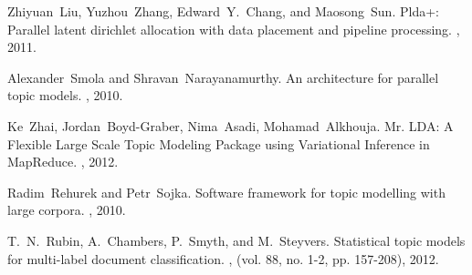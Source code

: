 \documentclass[12pt,a4paper,oneside,fleqn,leqno]{article}
\theoremstyle{definition}
\begin{document}
\begin{thebibliography}{1}
Zhiyuan~Liu, Yuzhou~Zhang, Edward~Y.~Chang, and Maosong~Sun.
\newblock Plda+: Parallel latent dirichlet allocation with data placement and pipeline processing.
, 2011.

Alexander~Smola and Shravan~Narayanamurthy.
\newblock An architecture for parallel topic models.
, 2010.

Ke~Zhai, Jordan~Boyd-Graber, Nima~Asadi, Mohamad~Alkhouja.
\newblock Mr. LDA: A Flexible Large Scale Topic Modeling Package using Variational Inference in MapReduce.
, 2012.

Radim~Rehurek and Petr~Sojka.
\newblock Software framework for topic modelling with large corpora.
, 2010.

T.~N.~Rubin, A.~Chambers, P.~Smyth, and M.~Steyvers.
\newblock Statistical topic models for multi-label document classification.
, (vol. 88, no. 1-2, pp. 157-208), 2012.

\end{thebibliography}
\end{document}
